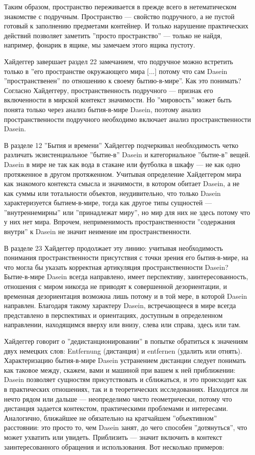 \documentclass[11pt]{book}
\begin{document}
Таким образом, пространство переживается в прежде всего в нетематическом знакомстве с подручным. Пространство --- свойство подручного, а не пустой готовый к заполнению предметами контейнер. И только нарушение практических действий позволяет заметить ''просто пространство'' --- только не найдя, например, фонарик в ящике, мы замечаем этого ящика пустоту.

Хайдеггер завершает раздел 22 замечанием, что подручное можно встретить только в ''его пространстве окружающего мира [...] потому что сам Dasein ''пространственен'' по отношению к своему бытию-в-мире''. Как это понимать? Согласно Хайдеггеру, пространственность подручного --- признак его включенности в мирской контекст значимости. Но ''мировость'' может быть понята только через анализ бытия-в-мире Dasein, поэтому анализ пространственности подручного необходимо включает анализ пространственности Dasein.

В разделе 12 ''Бытия и времени'' Хайдеггер подчеркивал необходимость четко различать экзистенциальное ''бытие-в'' Dasein и категориальное ''бытие-в'' вещей. Dasein в мире не так как вода в стакане или футболка в шкафу --- не как одно протяженное в другом протяженном. Учитывая определение Хайдеггером мира как знакомого контекста смысла и значимости, в котором обитает Dasein, а не как суммы или тотальности объектов, неудивительно, что только Dasein характеризуется бытием-в-мире, тогда как другое типы сущностей --- ''внутреннемирны'' или ''принадлежат миру'', но мир для них не здесь потому что у них нет мира. Впрочем, неприменимость пространственности ''содержания внутри'' к Dasein не значит неимение им пространственности.

В разделе 23 Хайдеггер продолжает эту линию: учитывая необходимость понимания пространственности присутствия с точки зрения его бытия-в-мире, на что могла бы указать корректная артикуляция пространственности Dasein? Бытие-в-мире Dasein всегда направлено, имеет перспективу, заинтересованность, отношения с миром никогда не приводят к совершенной дезориентации, и временная дезориентация возможна лишь потому и в той мере, в которой Dasein направлен. Благодаря такому характеру Dasein, встречающееся в мире всегда представлено в перспективах и ориентациях, доступным в определенном направлении, находящимся вверху или внизу, слева или справа, здесь или там.

Хайдеггер говорит о ''дедистанционировании'' в попытке обратиться к значениям двух немецких слов: Entfernung (дистанция) и entfernen (удалить или отнять). Характеризацию бытия-в-мире Dasein устранением дистанции следует понимать как таковое между, скажем, вами и машиной при вашем к ней приближении: Dasein позволяет сущностям присутствовать и сближаться, и это происходит как в практических отношениях, так и в теоретических исследованиях. Находится ли нечто рядом или дальше --- неопределимо чисто геометрически, потому что дистанция задается контекстом, практическими проблемами и интересами. Аналогично, ближайшее не обязательно на кратчайшем ''объективном'' расстоянии: это просто то, чем Dasein занят, до чего способен ''дотянуться'', что может ухватить или увидеть. Приблизить --- значит включить в контекст заинтересованного обращения и использования. Вот несколько примеров:
\end{document}
